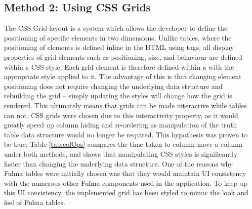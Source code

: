 \subsection{Method 2: Using CSS Grids}
The CSS Grid layout \cite{cssgrids} is a system which allows the developer to define the positioning of specific elements in two dimensions. Unlike tables, where the positioning of elements is defined inline in the HTML using tags, all display properties of grid elements such as positioning, size, and behaviour are defined within a CSS style. Each grid element is therefore defined within a  with the appropriate style applied to it. The advantage of this is that changing element positioning does not require changing the underlying data structure and rebuilding the grid -- simply updating the styles will change how the grid is rendered. This ultimately means that grids can be made interactive while tables can not. CSS grids were chosen due to this interactivity property, as it would greatly speed up column hiding and re-ordering as manipulation of the truth table data structure would no longer be required. This hypothesis was proven to be true; Table \ref{tab:colOps} compares the time taken to column move a column under both methods, and shows that manipulating CSS styles is significantly faster than changing the underlying data structure. One of the reasons why Fulma tables were initially chosen was that they would maintain UI consistency with the numerous other Fulma components used in the application. To keep up this UI consistency, the implemented grid has been styled to mimic the look and feel of Fulma tables. 

